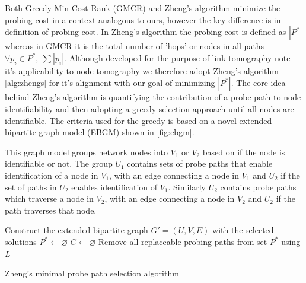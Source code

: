 Both Greedy-Min-Cost-Rank (GMCR) and Zheng's algorithm minimize the probing cost in a context analogous to ours, however the key difference is in definition of probing cost. In Zheng's algorithm the probing cost is defined as $|P^*|$ whereas in GMCR it is the total number of 'hops' or nodes in all paths $\forall p_i\in P^*,\ \sum |p_i|$. Although developed for the purpose of link tomography \cite{zheng_minimizing_2013} note it's applicability to node tomography we therefore adopt Zheng's algorithm \cref{alg:zhengs} for it's alignment with our goal of minimizing $|P^*|$. The core idea behind Zheng's algorithm is quantifying the contribution of a probe path to node identifiability and then adopting a greedy selection approach until all nodes are identifiable. The criteria used for the greedy is based on a novel extended bipartite graph model (EBGM) shown in \cref{fig:ebgm}.\par
This graph model groups network nodes into $V_1$ or $V_2$ based on if the node is identifiable or not. The group $U_1$ contains sets of probe paths that enable identification of a node in $V_1$, with an edge connecting a node in $V_1$ and $U_2$ if the set of paths in $U_2$ enables identification of $V_1$. Similarly $U_2$ contains probe paths which traverse a node in $V_2$, with an edge connecting a node in $V_2$ and $U_2$ if the path traverses that node.
\begin{algorithm}
    
    Construct the extended bipartite graph $G'=(U,V,E)$ with the selected solutions\;
    $P^* \gets \varnothing$ \;
    $C \gets \varnothing$ \;
    Remove all replaceable probing paths from set $P^*$ using $L$\;
    \caption{Zheng's minimal probe path selection algorithm}
    \label{alg:zhengs}
\end{algorithm}

